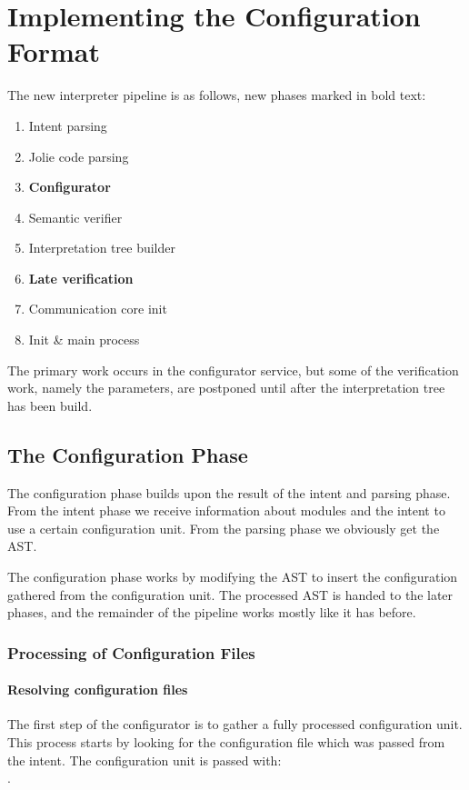 \section{Implementing the Configuration Format}
\label{sec:col_impl}

The new interpreter pipeline is as follows, new phases marked in bold text:

\begin{enumerate}
\item Intent parsing
\item Jolie code parsing
\item \textbf{Configurator}
\item Semantic verifier
\item Interpretation tree builder
\item \textbf{Late verification}
\item Communication core init
\item Init \& main process
\end{enumerate}

The primary work occurs in the configurator service, but some of the
verification work, namely the parameters, are postponed until after the
interpretation tree has been build.

\subsection{The Configuration Phase}

The configuration phase builds upon the result of the intent and parsing phase.
From the intent phase we receive information about modules and the intent to
use a certain configuration unit. From the parsing phase we obviously get the
AST.

The configuration phase works by modifying the AST to insert the configuration
gathered from the configuration unit. The processed AST is handed to the later
phases, and the remainder of the pipeline works mostly like it has before.

\subsubsection*{Processing of Configuration Files}

\paragraph{Resolving configuration files}

The first step of the configurator is to gather a fully processed configuration
unit. This process starts by looking for the configuration file which was
passed from the intent. The configuration unit is passed with:
\\.

